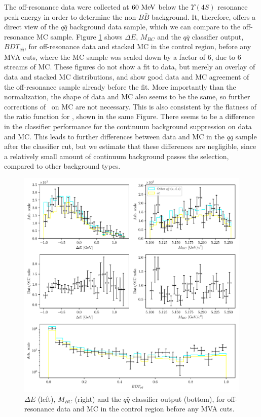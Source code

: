 The off-resonance data were collected at $60\mathrm{~MeV}$ below the $\Upsilon(4S)$ resonance peak energy in order to determine the non-$B\bar B$ background. It, therefore, offers a direct view of the $q\bar q$ background data sample, which we can compare to the off-resonance MC sample. Figure \ref{fig:offres_control} shows $\Delta E$, $M_{BC}$ and the $q \bar q$ classifier output, $BDT_{q\bar q}$, for off-resonance data and stacked MC in the control region, before any MVA cuts, where the MC sample was scaled down by a factor of $6$, due to 6 streams of MC. These figures do not show a fit to data, but merely an overlay of data and stacked MC distributions, and show good data and MC agreement of the off-resonance sample already before the fit. More importantly than the normalization, the shape of data and MC also seems to be the same, so further corrections of \vars~on MC are not necessary. This is also consistent by the flatness of the ratio function for \vars, shown in the same Figure. There seems to be a difference in the classifier performance for the continuum background suppression on data and MC. This leads to further differences between data and MC in the $q \bar q$ sample after the classifier cut, but we estimate that these differences are negligible, since a relatively small amount of continuum background passes the selection, compared to other background types.
\begin{figure}[H]
	\centering
	\captionsetup{width=0.8\linewidth}
	\includegraphics[width=\linewidth]{fig/offres_control}
	\caption{$\Delta E$ (left), $M_{BC}$ (right) and the $q \bar q$ classifier output (bottom), for off-resonance data and MC in the control region before any MVA cuts.}
	\label{fig:offres_control}
\end{figure}

